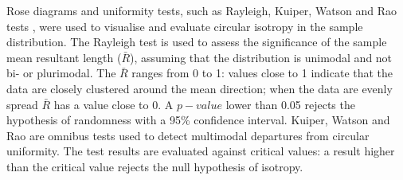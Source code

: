 \documentclass[preprint,authoryear,times]{elsarticle} %
\begin{document}

\begin{table}[]
  \caption{List of sampled observations for the fabric analysis.}
  \label{tab:1}
  \vspace{0.1in}
\end{table}

Rose diagrams and uniformity tests, such as Rayleigh, Kuiper, Watson and Rao tests \citep{Jammalamadaka2001}, were used to visualise and evaluate circular isotropy in the sample distribution. The Rayleigh test is used to assess the significance of the sample mean resultant length ($\bar{R}$), assuming that the distribution is unimodal and not bi- or plurimodal. The $\bar{R}$ ranges from 0 to 1: values close to 1 indicate that the data are closely clustered around the mean direction; when the data are evenly spread $\bar{R}$ has a value close to 0. A $p-value$ lower than 0.05 rejects the hypothesis of randomness with a 95\% confidence interval. Kuiper, Watson and Rao are omnibus tests used to detect multimodal departures from circular uniformity. %
The test results are evaluated against critical values: a result higher than the critical value rejects the null hypothesis of isotropy.%
\end{document}
